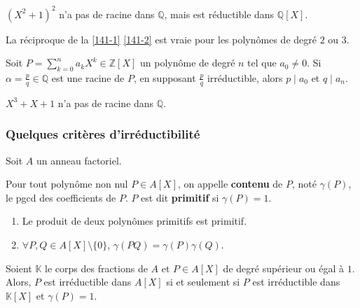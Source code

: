 	\begin{cexample}
		$(X^2+1)^2$ n'a pas de racine dans $\mathbb{Q}$, mais est réductible dans $\mathbb{Q}[X]$.
	\end{cexample}

	\begin{proposition}
		La réciproque de la \cref{141-1} \cref{141-2} est vraie pour les polynômes de degré $2$ ou $3$.
	\end{proposition}

	\begin{proposition}
		Soit $P = \sum_{k=0}^n a_k X^k \in \mathbb{Z}[X]$ un polynôme de degré $n$ tel que $a_0 \neq 0$. Si $\alpha = \frac{p}{q} \in \mathbb{Q}$ est une racine de $P$, en supposant $\frac{p}{q}$ irréductible, alors $p \mid a_0$ et $q \mid a_n$.
	\end{proposition}


	\begin{example}
		$X^3 + X + 1$ n'a pas de racine dans $\mathbb{Q}$.
	\end{example}

	\subsubsection{Quelques critères d'irréductibilité}

	Soit $A$ un anneau factoriel.


	\begin{definition}
		Pour tout polynôme non nul $P \in A[X]$, on appelle \textbf{contenu} de $P$, noté $\gamma(P)$, le pgcd des coefficients de $P$. $P$ est dit \textbf{primitif} si $\gamma(P) = 1$.
	\end{definition}

	\begin{lemma}[Gauss]
		\begin{enumerate}[label=(\roman*)]
			\item Le produit de deux polynômes primitifs est primitif.
			\item $\forall P, Q \in A[X] \setminus \{ 0 \}$, $\gamma(PQ) = \gamma(P) \gamma(Q)$.
		\end{enumerate}
	\end{lemma}

	\begin{theorem}
		Soient $\mathbb{K}$ le corps des fractions de $A$ et $P \in A[X]$ de degré supérieur ou égal à $1$. Alors, $P$ est irréductible dans $A[X]$ si et seulement si $P$ est irréductible dans $\mathbb{K}[X]$ et $\gamma(P)=1$.
	\end{theorem}

